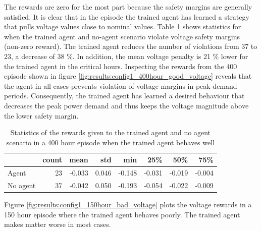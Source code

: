 \documentclass[class=book, crop=false]{standalone}
\begin{document}
The rewards are zero for the most part because the safety margins are generally satisfied. It is clear that in the episode the trained agent has learned a strategy that pulls voltage values close to nominal values. Table \ref{table:results:config1_400hour_good_voltage} shows statistics for when the trained agent and no-agent scenario violate voltage safety margins (non-zero reward). The trained agent reduces the number of violations from 37 to 23, a decrease of 38 \%.  In addition, the mean voltage penalty is 21 \% lower for the trained agent in the critical hours. Inspecting the rewards from the 400 episode shown in figure \ref{fig:results:config1_400hour_good_voltage} reveals that the agent in all cases prevents violation of voltage margins in peak demand periods. Consequently, the trained agent has learned a desired behaviour that decreases the peak power demand and thus keeps the voltage magnitude above the lower safety margin.

\begin{table}[h]
\center
\begin{tabular}{l|rrrrrrr}
         & count  & mean   & std   & min    & 25\%   & 50\%   & 75\%   \\
\hline
Agent    & 23 & -0.033 & 0.046 & -0.148 & -0.031 & -0.019 & -0.004 \\
No agent & 37 & -0.042 & 0.050 & -0.193 & -0.054 & -0.022 & -0.009 \\
\hline
\end{tabular}
\caption{Statistics of the rewards given to the trained agent and no agent scenario in a 400 hour episode when the trained agent behaves well}
\label{table:results:config1_400hour_good_voltage}
\end{table}

Figure \ref{fig:results:config1_150hour_bad_voltage} plots the voltage rewards in a 150 hour episode where the trained agent behaves poorly. The trained agent makes matter worse in most cases.
\end{document}
